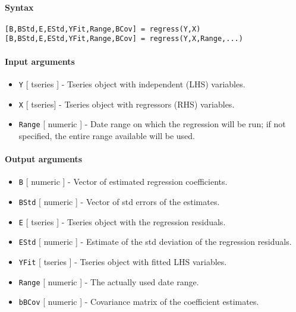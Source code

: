 


	\paragraph{Syntax}

\begin{verbatim}
[B,BStd,E,EStd,YFit,Range,BCov] = regress(Y,X)
[B,BStd,E,EStd,YFit,Range,BCov] = regress(Y,X,Range,...)
\end{verbatim}

\paragraph{Input arguments}

\begin{itemize}
\item
  \texttt{Y} {[} tseries {]} - Tseries object with independent (LHS)
  variables.
\item
  \texttt{X} {[} tseries{]} - Tseries object with regressors (RHS)
  variables.
\item
  \texttt{Range} {[} numeric {]} - Date range on which the regression
  will be run; if not specified, the entire range available will be
  used.
\end{itemize}

\paragraph{Output arguments}

\begin{itemize}
\item
  \texttt{B} {[} numeric {]} - Vector of estimated regression
  coefficients.
\item
  \texttt{BStd} {[} numeric {]} - Vector of std errors of the estimates.
\item
  \texttt{E} {[} tseries {]} - Tseries object with the regression
  residuals.
\item
  \texttt{EStd} {[} numeric {]} - Estimate of the std deviation of the
  regression residuals.
\item
  \texttt{YFit} {[} tseries {]} - Tseries object with fitted LHS
  variables.
\item
  \texttt{Range} {[} numeric {]} - The actually used date range.
\item
  \texttt{bBCov} {[} numeric {]} - Covariance matrix of the coefficient
  estimates.
\end{itemize}

